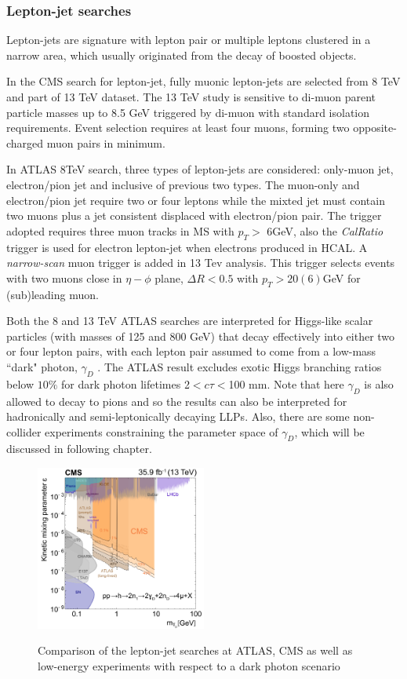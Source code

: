 \subsubsection{Lepton-jet searches}
Lepton-jets are signature with lepton pair or multiple leptons clustered in a narrow area, which usually originated from the decay of boosted objects. 

In the CMS search for lepton-jet, fully muonic lepton-jets are selected from 8 TeV and part of 13 TeV dataset. The 13 TeV study is sensitive to di-muon parent particle masses up to 8.5 GeV triggered by di-muon with standard isolation requirements. Event selection requires at least four muons, forming two opposite-charged muon pairs in minimum. 

In ATLAS 8TeV search, three types of lepton-jets are considered: only-muon jet, electron/pion jet and inclusive of previous two types. The muon-only and electron/pion jet require two or four leptons while the mixted jet must contain two muons plus a jet consistent displaced with electron/pion pair. The trigger adopted requires three muon tracks in MS with $p_T >$ 6GeV, also the \textit{CalRatio} trigger is used for electron lepton-jet when electrons produced in HCAL. A \textit{narrow-scan} muon trigger is added in 13 Tev analysis. This trigger selects events with two muons close in $\eta-\phi$ plane, $\Delta R < 0.5$ with $p_T > 20(6)$GeV for (sub)leading muon. 

Both the 8 and 13 TeV ATLAS searches are interpreted for Higgs-like scalar particles (with masses of 125 and 800 GeV) that decay effectively into either two or four lepton pairs, with each lepton pair assumed to come from a low-mass “dark" photon, $\gamma_D$ . The ATLAS result excludes exotic Higgs branching ratios below $10\%$ for dark photon lifetimes 2$ < c\tau < $100 mm. Note that here $\gamma_D$ is also allowed to decay to pions and so the results can also be interpreted for hadronically and semi-leptonically decaying LLPs. Also, there are some non-collider experiments constraining the parameter space of $\gamma_D$, which will be discussed in following chapter.
\begin{figure}
    \centering
    \caption{Comparison of the lepton-jet searches at ATLAS, CMS as well as low-energy experiments with respect to a dark photon scenario}
    \includegraphics[width=0.5\textwidth]{fig/leptonjet.png}
    \label{fig:lepton-jet}
\end{figure}


